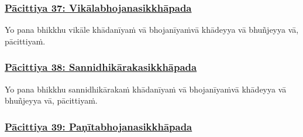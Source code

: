 \subsubsection*{\hyperref[exp37]{Pācittiya 37: Vikālabhojanasikkhāpada}}
\label{pac37}

Yo pana bhikkhu vikāle khādanīyaṁ vā bhojanīyaṁ\makeatletter\hyperlink{endnote299-appendix}\makeatother \thinspace vā khādeyya vā bhuñjeyya vā, pācittiyaṁ.



\subsubsection*{\hyperref[exp38]{Pācittiya 38: Sannidhikārakasikkhāpada}}
\label{pac38}

Yo pana bhikkhu sannidhikārakaṁ khādanīyaṁ vā bhojanīyaṁ\makeatletter\hyperlink{endnote300-appendix}\makeatother \thinspace vā khādeyya vā bhuñjeyya vā, pācittiyaṁ.



\subsubsection*{\hyperref[exp39]{Pācittiya 39: Paṇītabhojanasikkhāpada}}
\label{pac39}

